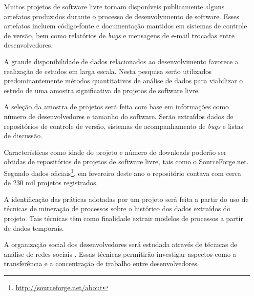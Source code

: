 \documentclass{article}
\begin{document}


Muitos projetos de software livre tornam disponíveis publicamente alguns
artefatos produzidos durante o processo de desenvolvimento de software. Esses
artefatos incluem código-fonte e documentação mantidos em sistemas de controle
de versão, bem como relatórios de \emph{bugs} e mensagens de e-mail trocadas
entre desenvolvedores. 

A grande disponibilidade de dados relacionados ao desenvolvimento favorece a
realização de estudos em larga escala. Nesta pesquisa serão utilizados
predominantemente métodos quantitativos de análise de dados para viabilizar o
estudo de uma amostra significativa de projetos de software livre.

A seleção da amostra de projetos será feita com base em informações como número
de desenvolvedores e tamanho do software. Serão extraídos dados de repositórios
de controle de versão, sistemas de acompanhamento de \emph{bugs} e listas de
discussão.


Características como idade do projeto e número de downloads poderão ser
obtidas de repositórios de projetos de software livre, tais como o
SourceForge.net. Segundo dados
oficiais\footnote{\url{http://sourceforge.net/about}}, em fevereiro deste ano
o repositório contava com cerca de 230 mil projetos registrados.

A identificação das práticas adotadas por um projeto será feita a partir do uso
de técnicas de mineração de processos \cite{rubin2007} sobre o histórico dos
dados extraídos do projeto. Tais técnicas têm como finalidade extrair modelos de
processos a partir de dados temporais.

A organização social dos desenvolvedores será estudada através de técnicas de
análise de redes sociais \cite{newman2003}. Essas técnicas permitirão
investigar aspectos como a transferência e a concentração de trabalho entre
desenvolvedores.
\end{document}
